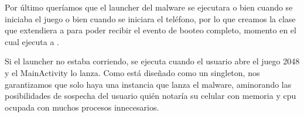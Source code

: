 Por \'ultimo quer\'iamos que el launcher del malware se ejecutara o bien cuando se iniciaba el juego o bien cuando se iniciara el tel\'efono, por lo que creamos la clase  que extendiera a  para poder recibir el evento de booteo completo, momento en el cual ejecuta a . 

Si el launcher no estaba corriendo, se ejecuta cuando el usuario abre el juego 2048 y el MainActivity lo lanza. Como  est\'a dise\~nado como un singleton, nos garantizamos que solo haya una instancia que lanza el malware, aminorando las posibilidades de sospecha del usuario qui\'en notar\'ia su celular con memoria y cpu ocupada con muchos procesos innecesarios. 

